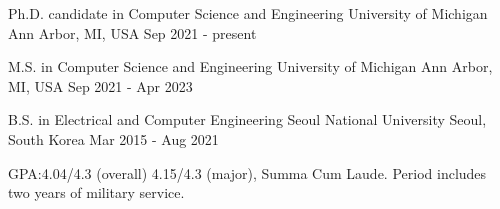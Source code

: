 

\begin{cventries}

  \cventry
    {Ph.D. candidate in Computer Science and Engineering}
    {University of Michigan} %
    {Ann Arbor, MI, USA} %
    {Sep 2021 - present} %
    {}

  \vspace{-5mm}

  \cventry
    {M.S. in Computer Science and Engineering}
    {University of Michigan} %
    {Ann Arbor, MI, USA} %
    {Sep 2021 - Apr 2023} %
    {}

  \vspace{-5mm}
    
  \cventry
    {B.S. in Electrical and Computer Engineering}
    {Seoul National University} %
    {Seoul, South Korea} %
    {Mar 2015 - Aug 2021} %
    {
      \begin{cvitems} %
        \item {GPA:\@ 4.04/4.3 (overall) 4.15/4.3 (major), Summa Cum Laude. Period includes two years of military service.}
      \end{cvitems}
    }
    
\end{cventries}
